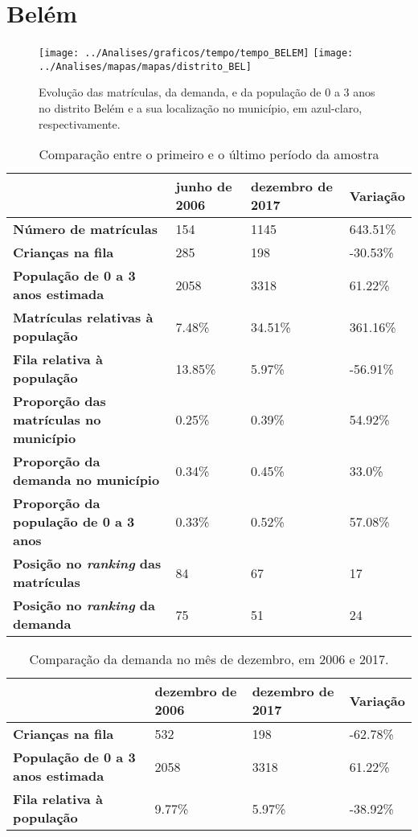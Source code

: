 \section{Belém}
\begin{figure}[H]
\centering
\texttt{[image: ../Analises/graficos/tempo/tempo\_BELEM]}
\texttt{[image: ../Analises/mapas/mapas/distrito\_BEL]}
\caption{Evolução das matrículas, da demanda, e da população de 0 a 3 anos no distrito Belém e a sua localização no município, em azul-claro, respectivamente.}
\end{figure}
\begin{table}[H]
\begin{tabular}{l|l|l|l}
\textbf{}                                      & \textbf{junho de 2006}       & \textbf{dezembro de 2017}    & \textbf{Variação} \\ \hline
\textbf{Número de matrículas}                  & 154 & 1145 & 643.51\% \\ \hline
\textbf{Crianças na fila}                      & 285 & 198 & -30.53\% \\ \hline
\textbf{População de 0 a 3 anos estimada}      & 2058 & 3318 & 61.22\% \\ \hline
\textbf{Matrículas relativas à população}      & 7.48\% & 34.51\% & 361.16\% \\ \hline
\textbf{Fila relativa à população}             & 13.85\% & 5.97\% & -56.91\% \\ \hline
\textbf{Proporção das matrículas no município} & 0.25\% & 0.39\% & 54.92\% \\ \hline
\textbf{Proporção da demanda no município}     & 0.34\% & 0.45\% & 33.0\% \\ \hline
\textbf{Proporção da população de 0 a 3 anos}  & 0.33\% & 0.52\% & 57.08\% \\ \hline
\textbf{Posição no \textit{ranking} das matrículas}     & 84 & 67 & 17 \\ \hline
\textbf{Posição no \textit{ranking} da demanda}         & 75 & 51 & 24 \\ 
\end{tabular}
\caption{Comparação entre o primeiro e o último período da amostra}
\end{table}
\begin{table}[H]
\begin{tabular}{l|l|l|l}
\textbf{}                                 & \textbf{dezembro de 2006} & \textbf{dezembro de 2017} & \textbf{Variação} \\ \hline
\textbf{Crianças na fila}                      & 532 & 198 & -62.78\% \\ \hline
\textbf{População de 0 a 3 anos estimada}      & 2058 & 3318 & 61.22\% \\ \hline
\textbf{Fila relativa à população}             & 9.77\% & 5.97\% & -38.92\% \\
\end{tabular}
\caption{Comparação da demanda no mês de dezembro, em 2006 e 2017.}
\end{table}
